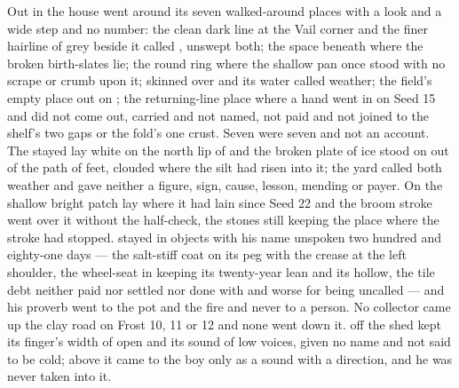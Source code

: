 Out in  the house went around its seven walked-around places with a look and a wide step and no number: the clean dark line at the Vail corner and the finer hairline of grey beside it called , unswept both; the space beneath  where the broken birth-slates lie; the round ring where the shallow pan once stood with no scrape or crumb upon it;  skinned over and its water called weather; the field's empty place out on ; the returning-line place where a hand went in on Seed 15 and did not come out, carried and not named, not paid and not joined to the shelf's two gaps or the fold's one crust. Seven were seven and not an account. The stayed  lay white on the north lip of  and the broken plate of ice stood on  out of the path of feet, clouded where the silt had risen into it; the yard called both weather and gave neither a figure, sign, cause, lesson, mending or payer. On  the shallow bright patch lay where it had lain since Seed 22 and the broom stroke went over it without the half-check, the stones still keeping the place where the stroke had stopped.  stayed in objects with his name unspoken two hundred and eighty-one days --- the salt-stiff coat on its peg with the crease at the left shoulder, the wheel-seat in  keeping its twenty-year lean and its hollow, the tile debt neither paid nor settled nor done with and worse for being uncalled --- and his proverb went to the pot and the fire and never to a person. No collector came up the clay road on Frost 10, 11 or 12 and none went down it.  off the shed kept its finger's width of open and its sound of low voices, given no name and not said to be cold; above it  came to the boy only as a sound with a direction, and he was never taken into it.

